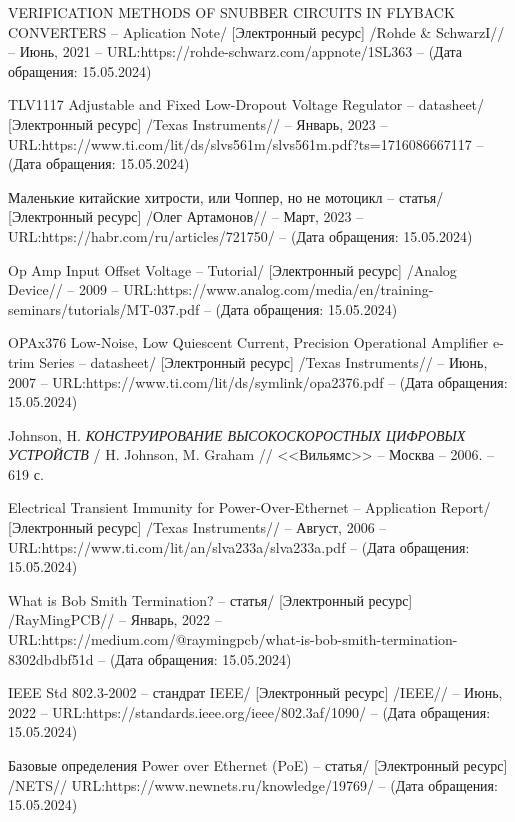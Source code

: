 \begin{thebibliography}{00}
 VERIFICATION METHODS OF SNUBBER CIRCUITS IN FLYBACK
CONVERTERS
-- Aplication Note/
[Электронный ресурс] /Rohde \& SchwarzI// -- Июнь, 2021 -- 
URL:https://rohde-schwarz.com/appnote/1SL363
-- (Дата обращения: 15.05.2024)

 TLV1117 Adjustable and Fixed Low-Dropout Voltage Regulator
  -- datasheet/
  [Электронный ресурс] /Texas Instruments// -- Январь, 2023 -- 
  URL:https://www.ti.com/lit/ds/slvs561m/slvs561m.pdf?ts=1716086667117
  -- (Дата обращения: 15.05.2024)

 Маленькие китайские хитрости, или Чоппер, но не мотоцикл
-- статья/
[Электронный ресурс] /Олег Артамонов// -- Март, 2023 -- 
URL:https://habr.com/ru/articles/721750/
-- (Дата обращения: 15.05.2024)

 Op Amp Input Offset Voltage 
-- Tutorial/
[Электронный ресурс] /Analog Device// --  2009 -- 
URL:https://www.analog.com/media/en/training-seminars/tutorials/MT-037.pdf
-- (Дата обращения: 15.05.2024)

 OPAx376 Low-Noise, Low Quiescent Current, Precision Operational Amplifier
e-trim Series
-- datasheet/
[Электронный ресурс] /Texas Instruments// -- Июнь, 2007 -- 
URL:https://www.ti.com/lit/ds/symlink/opa2376.pdf
-- (Дата обращения: 15.05.2024)

 Johnson, H.
\emph{КОНСТРУИРОВАНИЕ ВЫСОКОСКОРОСТНЫХ ЦИФРОВЫХ УСТРОЙСТВ} / H. Johnson, M. Graham // <<Вильямс>> --
Москва -- 2006. -- 619 с.

 Electrical Transient Immunity for 
Power-Over-Ethernet
-- Application Report/
[Электронный ресурс] /Texas Instruments// -- Август, 2006 -- 
URL:https://www.ti.com/lit/an/slva233a/slva233a.pdf
-- (Дата обращения: 15.05.2024)

 What is Bob Smith Termination?
-- статья/
[Электронный ресурс] /RayMingPCB// -- Январь, 2022 -- 
URL:https://medium.com/@raymingpcb/what-is-bob-smith-termination-8302dbdbf51d
-- (Дата обращения: 15.05.2024)


 IEEE Std 802.3-2002
-- стандрат IEEE/
[Электронный ресурс] /IEEE// -- Июнь, 2022 -- 
URL:https://standards.ieee.org/ieee/802.3af/1090/
-- (Дата обращения: 15.05.2024)

 Базовые определения Power over Ethernet (PoE)
-- статья/
[Электронный ресурс] /NETS// 
URL:https://www.newnets.ru/knowledge/19769/
-- (Дата обращения: 15.05.2024)



\end{thebibliography}
